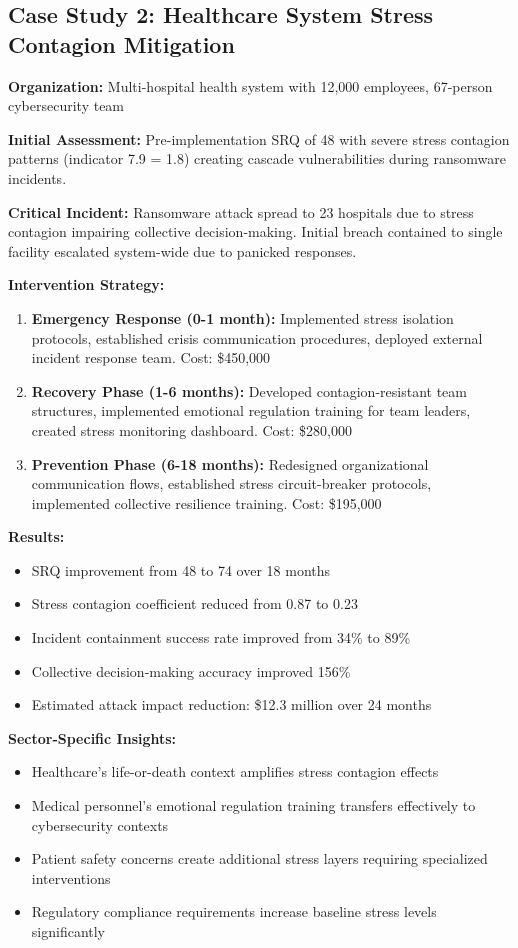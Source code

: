 \documentclass[11pt,a4paper]{article}
\begin{document}
\subsection{Case Study 2: Healthcare System Stress Contagion Mitigation}

\textbf{Organization:} Multi-hospital health system with 12,000 employees, 67-person cybersecurity team

\textbf{Initial Assessment:} Pre-implementation SRQ of 48 with severe stress contagion patterns (indicator 7.9 = 1.8) creating cascade vulnerabilities during ransomware incidents.

\textbf{Critical Incident:} Ransomware attack spread to 23 hospitals due to stress contagion impairing collective decision-making. Initial breach contained to single facility escalated system-wide due to panicked responses.

\textbf{Intervention Strategy:}
\begin{enumerate}
\item \textbf{Emergency Response (0-1 month):} Implemented stress isolation protocols, established crisis communication procedures, deployed external incident response team. Cost: \$450,000
\item \textbf{Recovery Phase (1-6 months):} Developed contagion-resistant team structures, implemented emotional regulation training for team leaders, created stress monitoring dashboard. Cost: \$280,000
\item \textbf{Prevention Phase (6-18 months):} Redesigned organizational communication flows, established stress circuit-breaker protocols, implemented collective resilience training. Cost: \$195,000
\end{enumerate}

\textbf{Results:}
\begin{itemize}
\item SRQ improvement from 48 to 74 over 18 months
\item Stress contagion coefficient reduced from 0.87 to 0.23
\item Incident containment success rate improved from 34\% to 89\%
\item Collective decision-making accuracy improved 156\%
\item Estimated attack impact reduction: \$12.3 million over 24 months
\end{itemize}

\textbf{Sector-Specific Insights:}
\begin{itemize}
\item Healthcare's life-or-death context amplifies stress contagion effects
\item Medical personnel's emotional regulation training transfers effectively to cybersecurity contexts
\item Patient safety concerns create additional stress layers requiring specialized interventions
\item Regulatory compliance requirements increase baseline stress levels significantly
\end{itemize}
\end{document}

